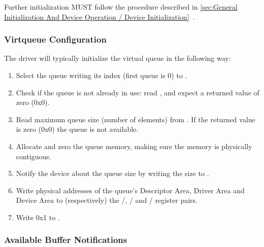 Further initialization MUST follow the procedure described in
\ref{sec:General Initialization And Device Operation / Device Initialization}~.

\subsubsection{Virtqueue Configuration}\label{sec:Virtio Transport Options / Virtio Over MMIO / MMIO-specific Initialization And Device Operation / Virtqueue Configuration}

The driver will typically initialize the virtual queue in the following way:

\begin{enumerate}
\item Select the queue writing its index (first queue is 0) to
   .

\item Check if the queue is not already in use: read ,
   and expect a returned value of zero (0x0).

\item Read maximum queue size (number of elements) from
   . If the returned value is zero (0x0) the
   queue is not available.

\item Allocate and zero the queue memory, making sure the memory
   is physically contiguous.

\item Notify the device about the queue size by writing the size to
   .

\item Write physical addresses of the queue's Descriptor Area,
   Driver Area and Device Area to (respectively) the
   /,
   / and
   / register pairs.

\item Write 0x1 to .
\end{enumerate}

\subsubsection{Available Buffer Notifications}\label{sec:Virtio Transport Options / Virtio Over MMIO / MMIO-specific Initialization And Device Operation / Available Buffer Notifications}

